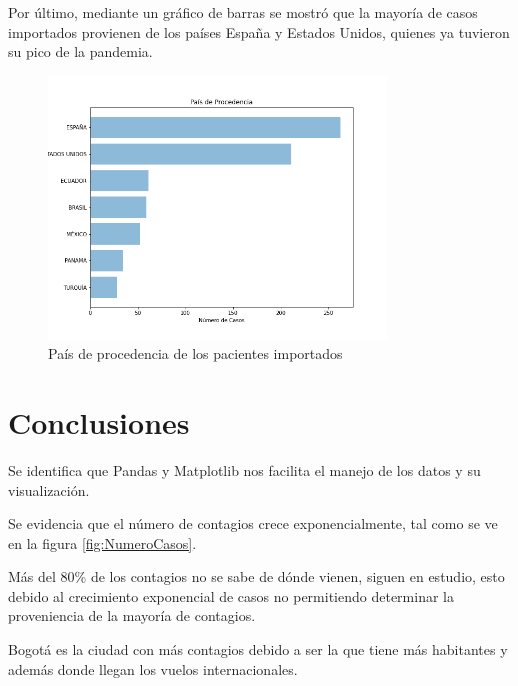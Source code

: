 \documentclass[conference,compsoc,onecolumn]{IEEEtran}
\begin{document}
Por último, mediante un gráfico de barras se mostró que la mayoría de casos importados provienen de los países España y Estados Unidos, quienes ya tuvieron su pico de la pandemia.
\begin{figure}[H]
    \centering
    \includegraphics[keepaspectratio,width=0.8\textwidth]{Pais.png}
    \caption{País de procedencia de los pacientes importados}
    \label{fig:PaisProcedencia}
\end{figure}

\section{Conclusiones}
\label{sec:conclusions}
Se identifica que Pandas y Matplotlib nos facilita el manejo de los datos y su visualización.

Se evidencia que el número de contagios crece exponencialmente, tal como se ve en la figura \ref{fig:NumeroCasos}.

Más del 80\% de los contagios no se sabe de dónde vienen, siguen en estudio, esto debido al crecimiento exponencial de casos no permitiendo determinar la proveniencia de la mayoría de contagios.

Bogotá es la ciudad con más contagios debido a ser la que tiene más habitantes y además donde llegan los vuelos internacionales.

\nocite{*}

\label{sec:biblio}
 





\end{document}
